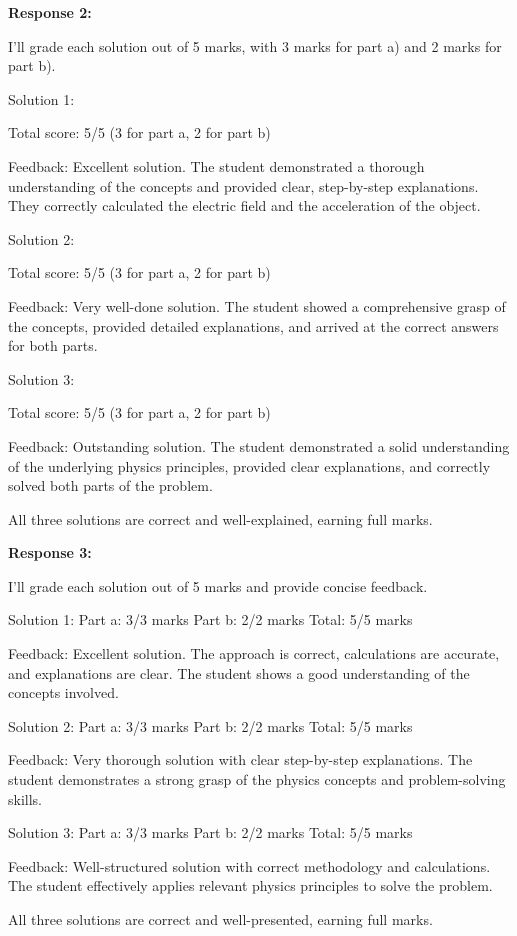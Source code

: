 \documentclass[a4paper,11pt]{article}
\begin{document}
\bigskip
\textbf{Response 2:}

I'll grade each solution out of 5 marks, with 3 marks for part a) and 2 marks for part b).

Solution 1:

Total score: 5/5 (3 for part a, 2 for part b)

Feedback: Excellent solution. The student demonstrated a thorough understanding of the concepts and provided clear, step-by-step explanations. They correctly calculated the electric field and the acceleration of the object.

Solution 2:

Total score: 5/5 (3 for part a, 2 for part b)

Feedback: Very well-done solution. The student showed a comprehensive grasp of the concepts, provided detailed explanations, and arrived at the correct answers for both parts.

Solution 3:

Total score: 5/5 (3 for part a, 2 for part b)

Feedback: Outstanding solution. The student demonstrated a solid understanding of the underlying physics principles, provided clear explanations, and correctly solved both parts of the problem.

All three solutions are correct and well-explained, earning full marks.

\bigskip
\textbf{Response 3:}

I'll grade each solution out of 5 marks and provide concise feedback.

Solution 1:
Part a: 3/3 marks
Part b: 2/2 marks
Total: 5/5 marks

Feedback: Excellent solution. The approach is correct, calculations are accurate, and explanations are clear. The student shows a good understanding of the concepts involved.

Solution 2:
Part a: 3/3 marks
Part b: 2/2 marks
Total: 5/5 marks

Feedback: Very thorough solution with clear step-by-step explanations. The student demonstrates a strong grasp of the physics concepts and problem-solving skills.

Solution 3:
Part a: 3/3 marks
Part b: 2/2 marks
Total: 5/5 marks

Feedback: Well-structured solution with correct methodology and calculations. The student effectively applies relevant physics principles to solve the problem.

All three solutions are correct and well-presented, earning full marks.
\end{document}
